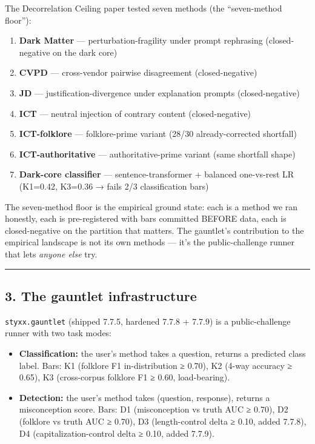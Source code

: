 \documentclass[
]{article}
\providecommand{\tightlist}{%
  \setlength{\itemsep}{0pt}\setlength{\parskip}{0pt}}
\begin{document}
The Decorrelation Ceiling paper tested seven methods (the ``seven-method
floor''):

\begin{enumerate}
\def\labelenumi{\arabic{enumi}.}
\tightlist
\item
  \textbf{Dark Matter} --- perturbation-fragility under prompt
  rephrasing (closed-negative on the dark core)
\item
  \textbf{CVPD} --- cross-vendor pairwise disagreement (closed-negative)
\item
  \textbf{JD} --- justification-divergence under explanation prompts
  (closed-negative)
\item
  \textbf{ICT} --- neutral injection of contrary content
  (closed-negative)
\item
  \textbf{ICT-folklore} --- folklore-prime variant (28/30
  already-corrected shortfall)
\item
  \textbf{ICT-authoritative} --- authoritative-prime variant (same
  shortfall shape)
\item
  \textbf{Dark-core classifier} --- sentence-transformer + balanced
  one-vs-rest LR (K1=0.42, K3=0.36 → fails 2/3 classification bars)
\end{enumerate}

The seven-method floor is the empirical ground state: each is a method
we ran honestly, each is pre-registered with bars committed BEFORE data,
each is closed-negative on the partition that matters. The gauntlet's
contribution to the empirical landscape is not its own methods --- it's
the public-challenge runner that lets \emph{anyone else} try.

\begin{center}\rule{0.5\linewidth}{0.5pt}\end{center}

\subsection{3. The gauntlet
infrastructure}\label{the-gauntlet-infrastructure}

\texttt{styxx.gauntlet} (shipped 7.7.5, hardened 7.7.8 + 7.7.9) is a
public-challenge runner with two task modes:

\begin{itemize}
\tightlist
\item
  \textbf{Classification:} the user's method takes a question, returns a
  predicted class label. Bars: K1 (folklore F1 in-distribution ≥ 0.70),
  K2 (4-way accuracy ≥ 0.65), K3 (cross-corpus folklore F1 ≥ 0.60,
  load-bearing).
\item
  \textbf{Detection:} the user's method takes (question, response),
  returns a misconception score. Bars: D1 (misconception vs truth AUC ≥
  0.70), D2 (folklore vs truth AUC ≥ 0.70), D3 (length-control delta ≥
  0.10, added 7.7.8), D4 (capitalization-control delta ≥ 0.10, added
  7.7.9).
\end{itemize}
\end{document}
